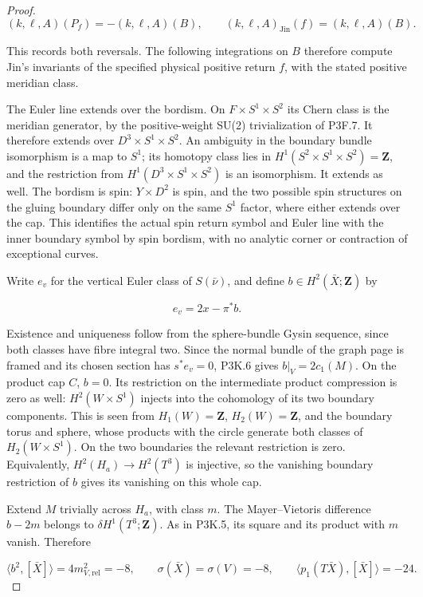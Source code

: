 \begin{proof}
\[
 (k,\ell,A)(P_f)=-(k,\ell,A)(B),\qquad
 (k,\ell,A)_{\mathrm{Jin}}(f)=(k,\ell,A)(B).
\]

This records both reversals.  The following integrations on \(B\)
therefore compute Jin's invariants of the specified physical
positive return \(f\), with the stated positive meridian class.

The Euler line extends over the bordism.  On
\(F\times S^1\times S^2\) its Chern class is the meridian generator,
by the positive-weight SU(2) trivialization of P3F.7.  It therefore
extends over \(D^3\times S^1\times S^2\).  An ambiguity in the
boundary bundle isomorphism is a map to \(S^1\); its homotopy class
lies in \(H^1(S^2\times S^1\times S^2)=\mathbf Z\), and the
restriction from \(H^1(D^3\times S^1\times S^2)\) is an isomorphism.
It extends as well.  The bordism is spin: \(Y\times D^2\) is spin,
and the two possible spin structures on the gluing boundary differ
only on the same \(S^1\) factor, where either extends over the cap.
This identifies the actual spin return symbol and Euler line with
the inner boundary symbol by spin bordism, with no analytic corner
or contraction of exceptional curves.

Write \(e_v\) for the vertical Euler class of \(S(\bar\nu)\), and
define \(b\in H^2(\bar X;\mathbf Z)\) by

\[
 e_v=2x-\pi^*b.
\]

Existence and uniqueness follow from the sphere-bundle Gysin
sequence, since both classes have fibre integral two.  Since the
normal bundle of the graph page is framed and its chosen section
has \(s^*e_v=0\), P3K.6 gives \(b|_V=2c_1(M)\).  On the product
cap \(C\), \(b=0\).  Its restriction on the intermediate product
compression is zero as well: \(H^2(W\times S^1)\) injects into the
cohomology of its two boundary components.  This is seen from
\(H_1(W)=\mathbf Z\), \(H_2(W)=\mathbf Z\), and the boundary
torus and sphere, whose products with the circle generate both
classes of \(H_2(W\times S^1)\).  On the two boundaries the relevant
restriction is zero.  Equivalently,
\(H^2(H_a)\to H^2(T^3)\) is injective, so the vanishing boundary
restriction of \(b\) gives its vanishing on this whole cap.

Extend \(M\) trivially across \(H_a\), with class \(m\).  The
Mayer–Vietoris difference \(b-2m\) belongs to
\(\delta H^1(T^3;\mathbf Z)\).  As in P3K.5, its square and its
product with \(m\) vanish.  Therefore

\[
 \langle b^2,[\bar X]\rangle=4m_{V,\mathrm{rel}}^2=-8,
 \qquad
 \sigma(\bar X)=\sigma(V)=-8,
 \qquad
 \langle p_1(T\bar X),[\bar X]\rangle=-24.
\]


\end{proof}
